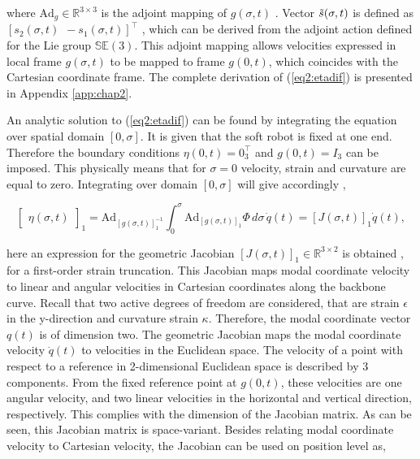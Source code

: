 where $\text{Ad}_g \in \mathbb{R}^{3 \times 3}$ \cite{2DLie} is the adjoint mapping of $g(\sigma,t)$ \cite{Sola2018}. Vector $\Tilde{s}(\sigma,t)$ is defined as $[s_2(\sigma,t) \hspace{5pt} -s_1(\sigma,t)]^\top$ \cite{2DLie}, which can be derived from the adjoint action defined for the Lie group $\mathbb{SE}(3)$. This adjoint mapping allows velocities expressed in local frame $g(\sigma,t)$ to be mapped to frame $g(0,t)$, which coincides with the Cartesian coordinate frame. The complete derivation of (\ref{eq2:etadif}) is presented in Appendix \ref{app:chap2}. 

An analytic solution to (\ref{eq2:etadif}) can be found by integrating the equation over spatial domain $[0,\sigma]$. It is given that the soft robot is fixed at one end. Therefore the boundary conditions $\eta(0,t) = 0_{3}^\top$ and $g(0,t) = I_{3}$ can be imposed. This physically means that for $\sigma = 0$ velocity, strain and curvature are equal to zero. Integrating over domain $[0,\sigma]$ will give accordingly  \cite{Caasenbrood2020},

\begin{equation}
  \begin{bmatrix} \eta(\sigma,t)\end{bmatrix}_1 = \text{Ad}_{[g(\sigma,t)]_1^{-1}} \int_0^{\sigma} \text{Ad}_{[g(\sigma,t)]_1} \Phi \hspace{2pt} d \sigma  \hspace{2pt} \dot{q}(t) = [J(\sigma,t)]_1\dot{q}(t),
    \label{eq2:J}
\end{equation}

here an expression for the geometric Jacobian $[J(\sigma,t)]_1 \in \mathbb{R}^{3\times 2}$ is obtained \cite{Caasenbrood2020}, for a first-order strain truncation. This Jacobian maps modal coordinate velocity to linear and angular velocities in Cartesian coordinates along the backbone curve. Recall that two active degrees of freedom are considered, that are strain $\epsilon$ in the y-direction and curvature strain $\kappa$. Therefore, the modal coordinate vector $q(t)$ is of dimension two. The geometric Jacobian maps the modal coordinate velocity $\dot{q}(t)$ to velocities in the Euclidean space. The velocity of a point with respect to a reference in 2-dimensional Euclidean space is described by 3 components. From the fixed reference point at $g(0,t)$, these velocities are one angular velocity, and two linear velocities in the horizontal and vertical direction, respectively. This complies with the dimension of the Jacobian matrix. As can be seen, this Jacobian matrix is space-variant. Besides relating modal coordinate velocity to Cartesian velocity, the Jacobian can be used on position level as,

